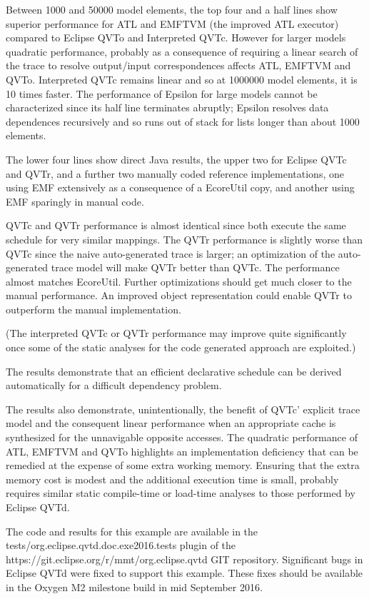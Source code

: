 \documentclass[conference]{IEEEtran}
\begin{document}
Between 1000 and 50000 model elements, the top four and a half lines show superior performance for ATL and EMFTVM (the improved ATL executor) compared to Eclipse QVTo and Interpreted QVTc. However for larger models  quadratic performance, probably as a consequence of requiring a linear search of the trace to resolve output/input correspondences affects ATL, EMFTVM and QVTo. Interpreted QVTc remains linear and so at 1000000 model elements, it is 10 times faster. The performance of Epsilon for large models cannot be characterized since its half line terminates abruptly; Epsilon resolves data dependences recursively and so runs out of stack for lists longer than about 1000 elements.

The lower four lines show direct Java results, the upper two for Eclipse QVTc and QVTr, and a further two manually coded reference implementations, one using EMF extensively as a consequence of a EcoreUtil copy, and another using EMF sparingly in manual code.

QVTc and QVTr performance is almost identical since both execute the same schedule for very similar mappings. The QVTr performance is slightly worse than QVTc since the naive auto-generated trace is larger; an optimization of the auto-generated trace model will make QVTr better than QVTc. The performance almost matches EcoreUtil. Further optimizations should get much closer to the manual performance. An improved object representation could enable QVTr to outperform the manual implementation.

(The interpreted QVTc or QVTr performance may improve quite significantly once some of the static analyses for the code generated approach are exploited.)

The results demonstrate that an efficient declarative schedule can be derived automatically for a difficult dependency problem.

The results also demonstrate, unintentionally, the benefit of QVTc' explicit trace model and the consequent linear performance when an appropriate cache is synthesized for the unnavigable opposite accesses. The quadratic performance of ATL, EMFTVM and QVTo highlights an implementation deficiency that can be remedied at the expense of some extra working memory. Ensuring that the extra memory cost is modest and the additional execution time is small, probably requires similar static compile-time or load-time analyses to those performed by Eclipse QVTd.

The code and results for this example are available in the tests/org.eclipse.qvtd.doc.exe2016.tests plugin of the https://git.eclipse.org/r/mmt/org.eclipse.qvtd GIT repository. Significant bugs in Eclipse QVTd were fixed to support this example. These fixes should be available in the Oxygen M2 milestone build in mid September 2016.
\end{document}

